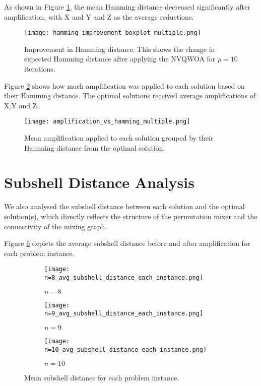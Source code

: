 As shown in Figure \ref{fig:ham improvement}, the mean Hamming distance decreased significantly after amplification, with X and Y and Z as the average reductions.
\begin{figure}[htbp]
    \centering
    \texttt{[image: hamming\_improvement\_boxplot\_multiple.png]}
    \caption{Improvement in Hamming distance. This shows the change in expected Hamming distance after applying the NVQWOA for $p=10$ iterations.}
    \label{fig:ham improvement}
\end{figure}

Figure \ref{fig:amp vs ham} shows how much amplification was applied to each solution based on their Hamming distance. The optimal solutions received average amplifications of X,Y and Z.
\begin{figure}[htbp]
    \centering
    \texttt{[image: amplification\_vs\_hamming\_multiple.png]}
    \caption{Mean amplification applied to each solution grouped by their Hamming distance from the optimal solution.}
    \label{fig:amp vs ham}
\end{figure}

\section{Subshell Distance Analysis}
We also analysed the subshell distance between each solution and the optimal solution(s), which directly reflects the structure of the permutation mixer and the connectivity of the mixing graph.

Figure \ref{fig:avg sub} depicts the average subshell distance before and after amplification for each problem instance.
\begin{figure}[htbp]
     \centering
     \begin{subfigure}{0.45\textwidth}
         \centering
         \texttt{[image: n=8\_avg\_subshell\_distance\_each\_instance.png]}
         \caption{$n=8$}
         \label{fig:avg sub 8}
     \end{subfigure}
     \hfill
     \begin{subfigure}{0.45\textwidth}
         \centering
         \texttt{[image: n=9\_avg\_subshell\_distance\_each\_instance.png]}
         \caption{$n=9$}
         \label{fig:avg sub 9}
     \end{subfigure}
     \hfill
     \begin{subfigure}{\textwidth}
         \centering
         \texttt{[image: n=10\_avg\_subshell\_distance\_each\_instance.png]}
         \caption{$n=10$}
         \label{fig:avg sub 10}
     \end{subfigure}
        \caption{Mean subshell distance for each problem instance.}
        \label{fig:avg sub}
\end{figure}

